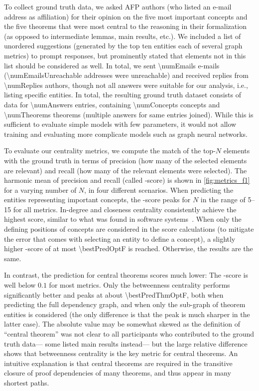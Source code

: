 To collect ground truth data, we asked AFP authors
(who listed an e-mail address as affiliation)
for their opinion on the five most important concepts
and the five theorems that were most central to the reasoning in their formalization
(as opposed to intermediate lemmas, main results, etc.).
We included a list of unordered suggestions
(generated by the top ten entities each of several graph metrics)
to prompt responses,
but prominently stated that elements not in this list should be considered as well.
In total, we sent \num{\numEmails} e-mails (\num{\numEmailsUnreachable} addresses were unreachable)
and received replies from \num{\numReplies} authors,
though not all answers were suitable for our analysis, i.e., listing specific entities.
In total, the resulting ground truth dataset consists of data for \num{\numAnswers} entries,
containing \num{\numConcepts} concepts and \num{\numTheorems} theorems
(multiple answers for same entries joined).
While this is sufficient to evaluate simple models with few parameters,
it would not allow training and evaluating more complicate models such as graph neural networks.

To evaluate our centrality metrics,
we compute the match of the top-$N$ elements with the ground truth
in terms of precision
(how many of the selected elements are relevant)
and recall
(how many of the relevant elements were selected).
The harmonic mean of precision and recall (called \fOne-score) is shown in \autoref{fig:metrics_f1} for a varying number of $N$,
in four different scenarios.
When predicting the entities representing important concepts,
the \fOne-score peaks for $N$ in the range of \numrange{5}{15} for all metrics.
In-degree and closeness centrality consistently achieve the highest score,
similar to what was found in software systems~\cite{DefectsMetrics2008Zimmermann}.
When only the defining positions of concepts are considered in the score calculations
(to mitigate the error that comes with selecting an entity to define a concept),
a slightly higher \fOne-score of at most \num[round-mode=places,round-precision=2]{\bestPredOptF}
is reached.
Otherwise, the results are the same.

In contrast, the prediction for central theorems scores much lower:
The \fOne-score is well below $0.1$ for most metrics.
Only the betweenness centrality performs significantly better and peaks at about \num[round-mode=places,round-precision=2]{\bestPredThmOptF},
both when predicting the full dependency graph, and when only the sub-graph of theorem entities is considered
(the only difference is that the peak is much sharper in the latter case).
The absolute value may be somewhat skewed as the definition of \enquote{central theorem} was not clear to all participants who contributed to the ground truth data---%
some listed main results instead---%
but the large relative difference shows that betweenness centrality is the key metric for central theorems.
An intuitive explanation is that central theorems are required in the transitive closure of proof dependencies of many theorems,
and thus appear in many shortest paths.


